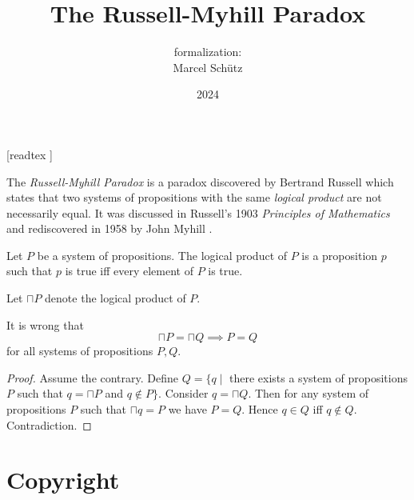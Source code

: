 \documentclass{article}
\title{The Russell-Myhill Paradox}
\author{\Naproche formalization: \vspace{0.5em} \\
Marcel Schütz}
\date{2024}
\begin{document}
  \maketitle

  \begin{imports}
    \begin{forthel}
      [readtex ]
    \end{forthel}
  \end{imports}

  \noindent The \emph{Russell-Myhill Paradox} is a paradox discovered by 
  Bertrand Russell which states that two systems of propositions with the same 
  \emph{logical product} are not necessarily equal.
  It was discussed in Russell's 1903 \emph{Principles of Mathematics}
  \cite[Appendix B]{Russell1903} and rediscovered in 1958 by John Myhill
  \cite{Myhill1958}.

  \begin{forthel}
    \begin{signature*}
      Let $P$ be a system of propositions.
      The logical product of $P$ is a proposition $p$ such that $p$ is true iff every element of $P$ is true.
    \end{signature*}
    
    Let $\sqcap P$ denote the logical product of $P$.
    
    \begin{theorem*}\label{russell_myhill_paradox}
      It is wrong that
      \[ \sqcap P = \sqcap Q \implies P = Q \]
      for all systems of propositions $P, Q$.
    \end{theorem*}
    \begin{proof}
      Assume the contrary.
      Define $Q = \{q \mid$ there exists a system of propositions $P$ such that $q = \sqcap P$ and $q \notin P\}$.
      Consider $q = \sqcap Q$.
      Then for any system of propositions $P$ such that $\sqcap q = P$ we have $P = Q$.
      Hence $q \in Q$ iff $q \notin Q$.
      Contradiction.
    \end{proof}
  \end{forthel}

  \printbibliography

  \section*{Copyright}
  \doclicenseThis
\end{document}
